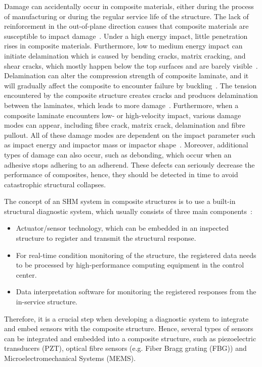 Damage can accidentally occur in composite materials, either during the process of manufacturing or during the regular service life of the structure. 
The lack of reinforce\-ment in the out-of-plane direction causes that composite materials are susceptible to impact damage~\cite{Cai2012}. 
Under a high energy impact, little penetration rises in composite materials.  
Furthermore, low to medium energy impact can initiate delamination which is caused by bending cracks, matrix cracking, and shear cracks,  which mostly happen below the top surfaces and are barely visible~\cite{Cai2012}. 
Delamination can alter the compression strength of composite laminate, and it will gradually affect the composite to encounter failure by buckling~\cite{NurAzrieBtSafri2018}.
The tension encountered by the composite structure creates cracks and produces delamination between the laminates, which leads to more damage~\cite{NurAzrieBtSafri2018}. 
Furthermore, when a composite laminate encounters low- or high-velocity impact, various damage modes can appear, including fibre crack, matrix crack, delamination and fibre pullout. 
All of these damage modes are dependent on the impact parameter such as impact energy and impactor mass or impactor shape~\cite{NurAzrieBtSafri2018}.
Moreover, additional types of damage can also occur, such as debonding, which occur when an adhesive stops adhering to an adherend.
These defects can seriously decrease the performance of composites, hence, they should be detected in time to avoid catastrophic structural collapses.  

The concept of an SHM system in composite structures is to use a built-in structural diagnostic system, which usually consists of three main components~\cite{Hassani2022}: 
\begin{itemize}
	\item Actuator/sensor technology, which can be embedded in an inspected structure to register and transmit the structural response.
	\item For real-time condition monitoring of the structure, the registered data needs to be processed by high-performance computing equipment in the control center.
	\item Data interpretation software for monitoring the registered responses from the in-service structure.
\end{itemize}
Therefore, it is a crucial step when developing a diagnostic system to integrate and embed sensors with the composite structure. 
Hence, several types of sensors can be integrated and embedded into a composite structure, such as piezoelectric transducers (PZT), optical fibre sensors (e.g. Fiber Bragg grating (FBG)) and Microelectromechani\-cal Systems (MEMS).

